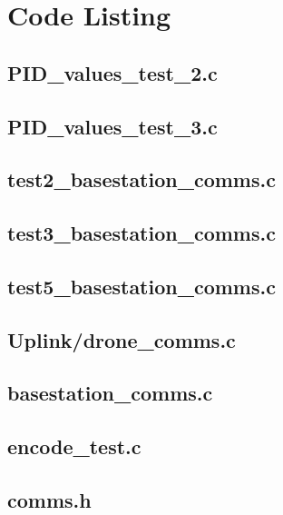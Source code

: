 \documentclass[a4paper,11pt]{article}
\begin{document}
\appendix
\section{Code Listing}
\subsection{PID\_values\_test\_2.c}
 
\subsection{PID\_values\_test\_3.c}
 
\subsection{test2\_basestation\_comms.c}
 
 \subsection{test3\_basestation\_comms.c}
 
 \subsection{test5\_basestation\_comms.c}
 
  \subsection{Uplink/drone\_comms.c}
 
   \subsection{basestation\_comms.c}
 
   \subsection{encode\_test.c}
 
   \subsection{comms.h}
 
\end{document}
